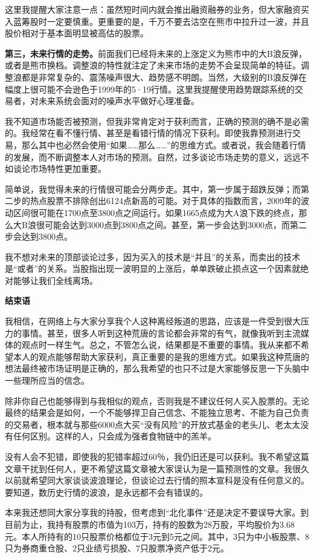 这里我提醒大家注意一点：虽然短时间内就会推出融资融券的业务，但大家融资买入蓝筹股时一定要慎重。更重要的是，千万不要去沽空在熊市中拉升过一波，并且股价相对于基本面明显被高估的股票。

\textbf{第三，未来行情的走势。}前面我们已经将未来的上涨定义为熊市中的大B浪反弹，或者是熊市换档。调整浪的特性就注定了未来市场的走势不会呈现简单的特征。调整浪都是非常复杂的、震荡噪声很大、趋势感不明朗。当然，大级别的B浪反弹在幅度上很可能不会逊色于1999年的5·19行情。这里我提醒使用趋势跟踪系统的交易者，对未来系统会面对的噪声水平做好心理准备。

我不知道市场能否被预测，但我非常肯定对于获利而言，正确的预测的确不是必需的。我经常在看不懂行情、甚至是看错行情的情况下获利。即使我靠预测进行交易，那么其中也必然会使用“如果……那么……”的思维方式。或者说，我会随着行情的发展，而不断调整本人对市场的预测。自然，过多谈论市场走势的意义，远远不如谈论市场特性更加重要。

简单说，我觉得未来的行情很可能会分两步走。其中，第一步属于超跌反弹；而第二步的热点股票不排除创出6124点新高的可能。对于具体的指数而言，2009年的波动区间很可能在1700点至3800点之间运行。如果1665点成为大A浪下跌的终点，那么大B浪很可能会达到3000点到3800点之间。甚至，第一步会达到3000点，而第二步会达到3800点。

我不想对未来的顶部谈论过多，因为买入的技术是“并且”的关系，而卖出的技术是“或者”的关系。当股指出现一波明显的上涨后，单单跌破止损点这一个因素就绝对能够让我们全线离场。

\textbf{结束语}

我相信，在网络上与大家分享我个人这种离经叛道的思路，应该是一件受到很大压力的事情。甚至，很多人听到这种荒唐的言论都会非常的有气，就像我听到主流媒体的观点时一样生气。总之，不管怎么说，结果都是不重要的事情。我从来都不希望本人的观点能够帮助大家获利，真正重要的是我的思维方式。如果我这种荒唐的想法最终被市场证明是正确的，那么我希望的也只不过是大家能够反思一下头脑中一些理所应当的信念。

除非你自己也能够得到与我相似的观点，否则我是不建议任何人买入股票的。无论最终的结果会是如何，一个不能够捍卫自己信念、不能独立思考、不能为自己负责的交易者，根本就与那些6000点大买“没有风险”的开放式基金的老头儿、老太太没有任何区别。这样的人，只会成为强者食物链中的羔羊。

没有人会不犯错，即使我的犯错率超过60％，我仍旧还是可以获利。我不希望这篇文章干扰到任何人，更不希望这篇文章被大家误认为是一篇预测性的文章。我很久以前就希望同大家谈谈波浪理论，但谈论过去行情的照本宣科是没有任何意义的。要知道，数历史行情的波浪，是永远都不会有错误的。

本来我还想同大家分享我的持股，但考虑到“北化事件”还是决定不要误导大家。到目前为止，我持有股票的市值为103万，持有的股数为28万股，平均股价为3.68元。本人所持有的10只股票价格都位于3元到5元之间。其中，3只为中小板股票、8只为券商重仓股、2只业绩亏损股、7只股票净资产低于2元。

